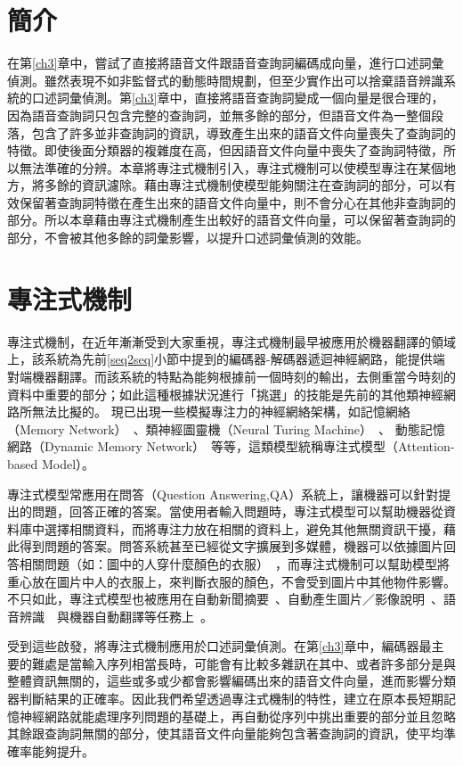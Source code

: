 \label{ch4}
\section{簡介}
在第\ref{ch3}章中，嘗試了直接將語音文件跟語音查詢詞編碼成向量，進行口述詞彙偵測。雖然表現不如非監督式的動態時間規劃，但至少實作出可以捨棄語音辨識系統的口述詞彙偵測。第\ref{ch3}章中，直接將語音查詢詞變成一個向量是很合理的，因為語音查詢詞只包含完整的查詢詞，並無多餘的部分，但語音文件為一整個段落，包含了許多並非查詢詞的資訊，導致產生出來的語音文件向量喪失了查詢詞的特徵。即使後面分類器的複雜度在高，但因語音文件向量中喪失了查詢詞特徵，所以無法準確的分辨。本章將專注式機制引入，專注式機制可以使模型專注在某個地方，將多餘的資訊濾除。藉由專注式機制使模型能夠關注在查詢詞的部分，可以有效保留著查詢詞特徵在產生出來的語音文件向量中，則不會分心在其他非查詢詞的部分。所以本章藉由專注式機制產生出較好的語音文件向量，可以保留著查詢詞的部分，不會被其他多餘的詞彙影響，以提升口述詞彙偵測的效能。
\section{專注式機制}
專注式機制，在近年漸漸受到大家重視，專注式機制最早被應用於機器翻譯的領域上，該系統為先前\ref{seq2seq}小節中提到的編碼器-解碼器遞迴神經網路，能提供端對端機器翻譯。而該系統的特點為能夠根據前一個時刻的輸出，去側重當今時刻的資料中重要的部分；如此這種根據狀況進行「挑選」的技能是先前的其他類神經網路所無法比擬的。
現已出現一些模擬專注力的神經網絡架構，如記憶網絡（Memory
Network）~\cite{sukhbaatar2015end}、類神經圖靈機（Neural Turing
Machine）~\cite{graves2014neural}、 動態記憶網路（Dynamic
Memory
Network）~\cite{kumar2015ask}等等，這類模型統稱專注式模型（Attention-based
Model）。

專注式模型常應用在問答（Question
Answering,QA）系統上，讓機器可以針對提出的問題，回答正確的答案。當使用者輸入問題時，專注式模型可以幫助機器從資料庫中選擇相關資料，而將專注力放在相關的資料上，避免其他無關資訊干擾，藉此得到問題的答案。問答系統甚至已經從文字擴展到多媒體，機器可以依據圖片回答相關問題（如：圖中的人穿什麼顏色的衣服）~\cite{agrawal2015vqa}，而專注式機制可以幫助模型將重心放在圖片中人的衣服上，來判斷衣服的顏色，不會受到圖片中其他物件影響。不只如此，專注式模型也被應用在自動新聞摘要~\cite{rush2015neural}、自動產生圖片／影像說明~\cite{xu2015show}、語音辨識~\cite{chan2016listen}~與機器自動翻譯等任務上~\cite{bahdanau2014neural}。

受到這些啟發，將專注式機制應用於口述詞彙偵測。在第\ref{ch3}章中，編碼器最主要的難處是當輸入序列相當長時，可能會有比較多雜訊在其中、或者許多部分是與整體資訊無關的，這些或多或少都會影響編碼出來的語音文件向量，進而影響分類器判斷結果的正確率。因此我們希望透過專注式機制的特性，建立在原本長短期記憶神經網路就能處理序列問題的基礎上，再自動從序列中挑出重要的部分並且忽略其餘跟查詢詞無關的部分，使其語音文件向量能夠包含著查詢詞的資訊，使平均準確率能夠提升。
